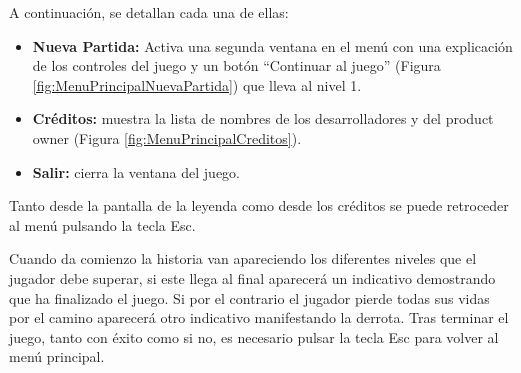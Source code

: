 A continuación, se detallan cada una de ellas: 
\begin{itemize}
	\item \textbf{Nueva Partida:} Activa una segunda ventana en el menú con una explicación de los controles del juego  y un botón ``Continuar al juego'' (Figura \ref{fig:MenuPrincipalNuevaPartida}) que lleva al nivel 1.	
	\item \textbf{Créditos:} muestra la lista de nombres de los desarrolladores y del product owner (Figura \ref{fig:MenuPrincipalCreditos}).  
	\item \textbf{Salir:} cierra la ventana del juego. 
\end{itemize}



Tanto desde la pantalla de la leyenda como desde los créditos se puede retroceder al menú pulsando la tecla Esc. 


Cuando da comienzo la historia van apareciendo los diferentes niveles que el jugador debe superar, si este llega al final aparecerá un indicativo demostrando que ha finalizado el juego. Si por el contrario el jugador pierde todas sus vidas por el camino aparecerá otro indicativo manifestando la derrota. Tras terminar el juego, tanto con éxito como si no, es necesario pulsar la tecla Esc para volver al menú principal.    